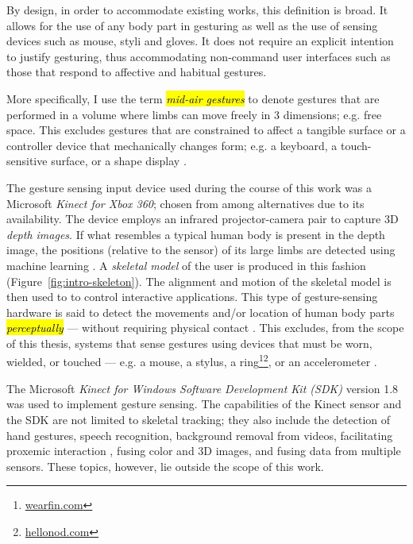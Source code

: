 By design, in order to accommodate existing works, this definition is broad. It allows for the use of any body part in gesturing as well as the use of sensing devices such as mouse, styli and gloves. It does not require an explicit intention to justify gesturing, thus accommodating non-command user interfaces \parencite{Nielsen:1993:noncommand} such as those that respond to affective \parencite{Kapur:2005} and habitual \parencite{Liu:2009} gestures.

More specifically, I use the term \hl{\emph{mid-air gestures}} to denote gestures that are performed in a volume where limbs can move freely in 3 dimensions; e.g. free space. This excludes gestures that are constrained to affect a tangible surface or a controller device that mechanically changes form; e.g. a keyboard, a touch-sensitive surface, or a shape display \parencite{Follmer:2013}.

The gesture sensing input device used during the course of this work was a Microsoft \emph{Kinect for Xbox 360}; chosen from among alternatives due to its availability. The device employs an infrared projector-camera pair to capture 3D \emph{depth images}. If what resembles a typical human body is present in the depth image, the positions (relative to the sensor) of its large limbs are detected using machine learning \parencite{Girshick:2011, Shotton:2011, Shotton:2012, Shotton:2013}. A \emph{skeletal model} of the user is produced in this fashion (Figure~\ref{fig:intro-skeleton}). The alignment and motion of the skeletal model is then used to to control interactive applications. This type of gesture-sensing hardware is said to detect the movements and/or location of human body parts \hl{\emph{perceptually}} --- without requiring physical contact \parencite{Turk:2000, Crowley:2000}. This excludes, from the scope of this thesis, systems that sense gestures using devices that must be worn, wielded, or touched --- e.g. a mouse, a stylus, a ring\footnote{\href{http://www.wearfin.com/}{wearfin.com}}\footnote{\href{https://www.hellonod.com/}{hellonod.com}}, or an accelerometer \parencite{Kela:2006, Ashbrook:2010}.

The Microsoft \emph{Kinect for Windows Software Development Kit (SDK)} version 1.8 was used to implement gesture sensing. The capabilities of the Kinect sensor and the SDK are not limited to skeletal tracking; they also include the detection of hand gestures, speech recognition, background removal from videos, facilitating proxemic interaction \parencite{Ballendat:2010}, fusing color and 3D images, and fusing data from multiple sensors. These topics, however, lie outside the scope of this work.

